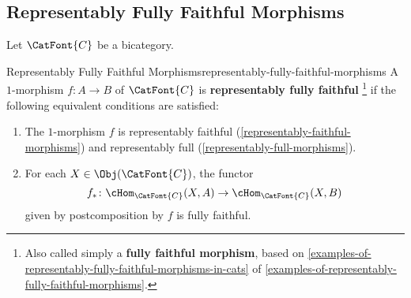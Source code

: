 \subsection{Representably Fully Faithful Morphisms}\label{subsection-representably-fully-faithful-morphisms}
Let $\CatFont{C}$ be a bicategory.
\begin{definition}{Representably Fully Faithful Morphisms}{representably-fully-faithful-morphisms}%
    A $1$-morphism $f\colon A\to B$ of $\CatFont{C}$ is \textbf{representably fully faithful}%
    \footnote{%
        Also called simply a \textbf{fully faithful morphism}, based on \cref{examples-of-representably-fully-faithful-morphisms-in-cats} of \cref{examples-of-representably-fully-faithful-morphisms}.
        \par\vspace*{\TCBBoxCorrection}
    } %
    if the following equivalent conditions are satisfied:
    \begin{enumerate}
        \item\label{representably-fully-faithful-morphisms-1}The $1$-morphism $f$ is representably faithful (\cref{representably-faithful-morphisms}) and representably full (\cref{representably-full-morphisms}).
        \item\label{representably-fully-faithful-morphisms-2}For each $X\in\Obj(\CatFont{C})$, the functor
            \[
                f_{*}%
                \colon%
                \cHom_{\CatFont{C}}(X,A)%
                \to%
                \cHom_{\CatFont{C}}(X,B)%
            \]%
            given by postcomposition by $f$ is fully faithful.
    \end{enumerate}
\end{definition}
